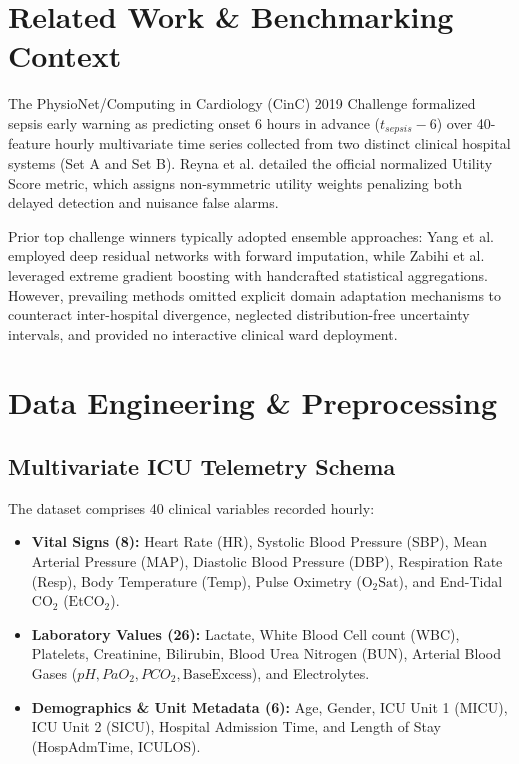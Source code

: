 \documentclass[conference]{IEEEtran}
\begin{document}
\section{Related Work \& Benchmarking Context}
The PhysioNet/Computing in Cardiology (CinC) 2019 Challenge formalized sepsis early warning as predicting onset 6 hours in advance ($t_{sepsis}-6$) over 40-feature hourly multivariate time series collected from two distinct clinical hospital systems (Set A and Set B). Reyna et al. \cite{reyna2020early} detailed the official normalized Utility Score metric, which assigns non-symmetric utility weights penalizing both delayed detection and nuisance false alarms.

Prior top challenge winners typically adopted ensemble approaches: Yang et al. employed deep residual networks with forward imputation, while Zabihi et al. leveraged extreme gradient boosting with handcrafted statistical aggregations. However, prevailing methods omitted explicit domain adaptation mechanisms to counteract inter-hospital divergence, neglected distribution-free uncertainty intervals, and provided no interactive clinical ward deployment.

\section{Data Engineering \& Preprocessing}

\subsection{Multivariate ICU Telemetry Schema}
The dataset comprises 40 clinical variables recorded hourly:
\begin{itemize}
    \item \textbf{Vital Signs (8):} Heart Rate (HR), Systolic Blood Pressure (SBP), Mean Arterial Pressure (MAP), Diastolic Blood Pressure (DBP), Respiration Rate (Resp), Body Temperature (Temp), Pulse Oximetry ($\text{O}_2\text{Sat}$), and End-Tidal $\text{CO}_2$ ($\text{EtCO}_2$).
    \item \textbf{Laboratory Values (26):} Lactate, White Blood Cell count (WBC), Platelets, Creatinine, Bilirubin, Blood Urea Nitrogen (BUN), Arterial Blood Gases ($pH, PaO_2, PCO_2, \text{BaseExcess}$), and Electrolytes.
    \item \textbf{Demographics \& Unit Metadata (6):} Age, Gender, ICU Unit 1 (MICU), ICU Unit 2 (SICU), Hospital Admission Time, and Length of Stay (HospAdmTime, ICULOS).
\end{itemize}
\end{document}

